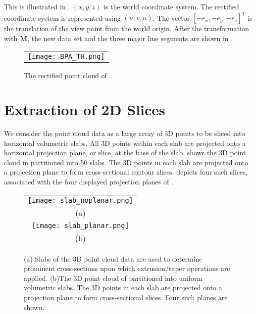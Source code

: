 This is illustrated in . $(x, y, z)$ is the world coordinate system.
The rectified coordinate system is represented using $(u, v, n)$. 
The vector $[-e_x, -e_y, -e_z]^T$ is the translation of the view point from the world origin.
After the transformation with $\mathbf{M}$, the new data set and the three major line segments are
shown in .

\begin{figure}[htbp]
\begin{center}
\begin{tabular}{c}
\texttt{[image: BPA\_TH.png]}
\end{tabular}
\end{center}
\caption{ The rectified point cloud of . }
\label{fig:pc_rect}
\end{figure}


\section{Extraction of 2D Slices}
\label{sec:image_slicing}

We consider the point cloud data as a large array of 3D points to be
sliced into horizontal volumetric slabs.
All 3D points within each slab are projected onto a horizontal projection
plane, or slice, at the base of the slab.
 shows the 3D point cloud in  partitioned into
50 slabs.
The 3D points in each slab are projected onto a projection plane to
form cross-sectional contour slices.
 depicts four such slices, associated with the four displayed
projection planes of .

\begin{figure} [htbp]
\begin{center}
\begin{tabular}{c}
\texttt{[image: slab\_noplanar.png]} \\
(a) \\
\texttt{[image: slab\_planar.png]} \\
(b)
\end{tabular}
\end{center}
\caption{
(a) Slabs of the 3D point cloud data are used to determine prominent
cross-sections upon which extrusion/taper operations are applied.
(b)The 3D point cloud of  partitioned into uniform
volumetric slabs.
The 3D points in each slab are projected onto a projection plane to
form cross-sectional slices. Four such planes are shown.}
\label{fig:slice_slab}
\end{figure}

